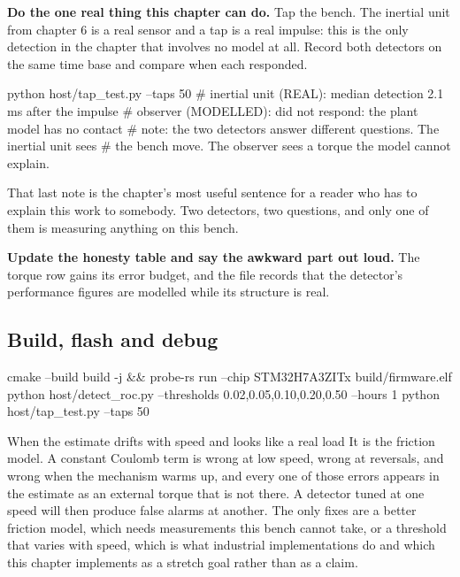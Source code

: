 \begin{steps}
\item \textbf{Do the one real thing this chapter can do.} Tap the bench. The
inertial unit from chapter 6 is a real sensor and a tap is a real impulse: this
is the only detection in the chapter that involves no model at all. Record both
detectors on the same time base and compare when each responded.
\begin{shellcode}
python host/tap_test.py --taps 50
# inertial unit (REAL):  median detection 2.1 ms after the impulse
# observer (MODELLED):   did not respond: the plant model has no contact
# note: the two detectors answer different questions. The inertial unit sees
#       the bench move. The observer sees a torque the model cannot explain.
\end{shellcode}
That last note is the chapter's most useful sentence for a reader who has to
explain this work to somebody. Two detectors, two questions, and only one of
them is measuring anything on this bench.

\item \textbf{Update the honesty table and say the awkward part out loud.} The
torque row gains its error budget, and the file records that the detector's
performance figures are modelled while its structure is real.
\end{steps}

\subsection*{Build, flash and debug}


\begin{shellcode}
cmake --build build -j && probe-rs run --chip STM32H7A3ZITx build/firmware.elf
python host/detect_roc.py --thresholds 0.02,0.05,0.10,0.20,0.50 --hours 1
python host/tap_test.py --taps 50
\end{shellcode}

\begin{note}{When the estimate drifts with speed and looks like a real load}
It is the friction model. A constant Coulomb term is wrong at low speed, wrong
at reversals, and wrong when the mechanism warms up, and every one of those
errors appears in the estimate as an external torque that is not there. A
detector tuned at one speed will then produce false alarms at another. The only
fixes are a better friction model, which needs measurements this bench cannot
take, or a threshold that varies with speed, which is what industrial
implementations do and which this chapter implements as a stretch goal rather
than as a claim.
\end{note}

